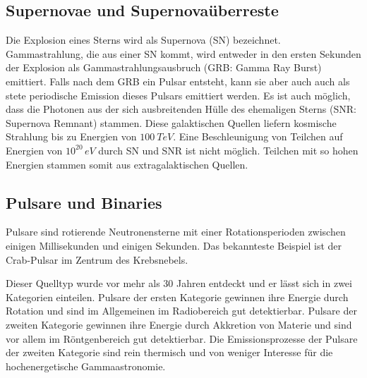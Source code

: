 \subsection{Supernovae und Supernovaüberreste}
Die Explosion eines Sterns wird als Supernova (SN) bezeichnet.
Gammastrahlung, die aus einer SN kommt, wird entweder in den ersten Sekunden der Explosion als Gammastrahlungsausbruch (GRB: Gamma Ray Burst) emittiert.
Falls nach dem GRB ein Pulsar entsteht, kann sie aber auch auch als stete periodische Emission dieses Pulsars emittiert werden.
Es ist auch möglich, dass die Photonen aus der sich ausbreitenden Hülle des ehemaligen Sterns (SNR: Supernova Remnant) stammen. 
Diese galaktischen Quellen liefern kosmische Strahlung bis zu Energien von $\SI{100}{TeV}$\cite{Weekes}.
Eine Beschleunigung von Teilchen auf Energien von $10^{20}\,\si{eV}$ durch SN und SNR ist nicht möglich.
Teilchen mit so hohen Energien stammen somit aus extragalaktischen Quellen.\cite{Weekes}



\subsection{Pulsare und Binaries}
Pulsare sind rotierende Neutronensterne mit einer Rotationsperioden zwischen einigen Millisekunden und einigen Sekunden.
Das bekannteste Beispiel ist der Crab-Pulsar im Zentrum des Krebsnebels.

Dieser Quelltyp wurde vor mehr als 30 Jahren entdeckt und er lässt sich in zwei Kategorien einteilen.
Pulsare der ersten Kategorie gewinnen ihre Energie durch Rotation und sind im Allgemeinen im Radiobereich gut detektierbar.
Pulsare der zweiten Kategorie gewinnen ihre Energie durch Akkretion von Materie und sind vor allem im Röntgenbereich gut detektierbar.
Die Emissionsprozesse der Pulsare der zweiten Kategorie sind rein thermisch und von weniger Interesse für die hochenergetische Gammaastronomie.

